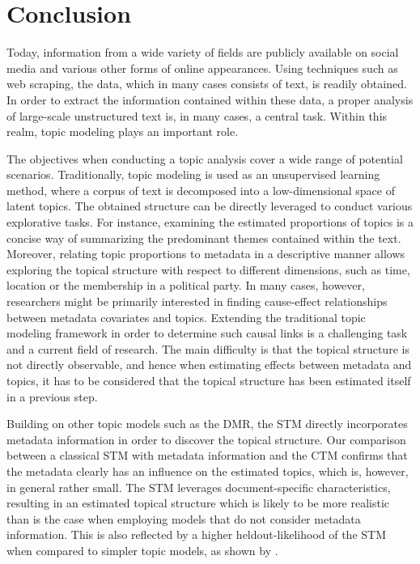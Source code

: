 \section{Conclusion}

Today, information from a wide variety of fields are publicly available on social media and various other forms of online appearances. Using techniques such as web scraping, the data, which in many cases consists of text, is readily obtained. In order to extract the information contained within these data, a proper analysis of large-scale unstructured text is, in many cases, a central task. Within this realm, topic modeling plays an important role.

The objectives when conducting a topic analysis cover a wide range of potential scenarios. Traditionally, topic modeling is used as an unsupervised learning method, where a corpus of text is decomposed into a low-dimensional space of latent topics. The obtained structure can be directly leveraged to conduct various explorative tasks. For instance, examining the estimated proportions of topics is a concise way of summarizing the predominant themes contained within the text. Moreover, relating topic proportions to metadata in a descriptive manner allows exploring the topical structure with respect to different dimensions, such as time, location or the membership in a political party. In many cases, however, researchers might be primarily interested in finding cause-effect relationships between metadata covariates and topics. Extending the traditional topic modeling framework in order to determine such causal links is a challenging task and a current field of research. The main difficulty is that the topical structure is not directly observable, and hence when estimating effects between metadata and topics, it has to be considered that the topical structure has been estimated itself in a previous step.

Building on other topic models such as the DMR, the STM directly incorporates metadata information in order to discover the topical structure. Our comparison between a classical STM with metadata information and the CTM confirms that the metadata clearly has an influence on the estimated topics, which is, however, in general rather small. The STM leverages document-specific characteristics, resulting in an estimated topical structure which is likely to be more realistic than is the case when employing models that do not consider metadata information. This is also reflected by a higher heldout-likelihood of the STM when compared to simpler topic models, as shown by \cite{roberts2016model}.

